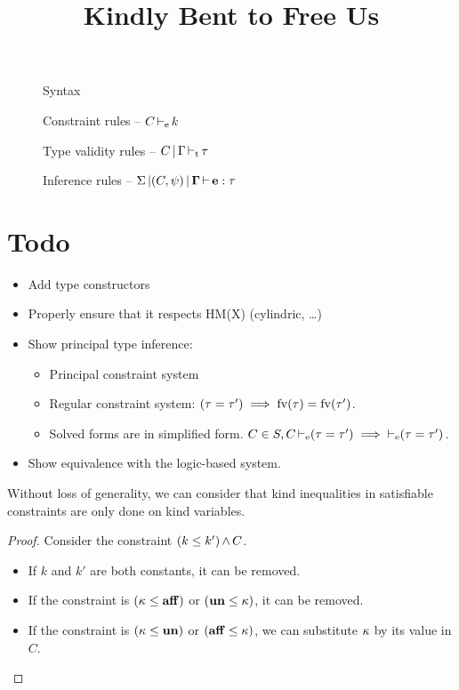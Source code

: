 \documentclass[manuscript,author]{acmart}\settopmatter{printfolios=true}
\begin{document}
\title{Kindly Bent to Free Us}
\maketitle

\begin{figure*}[h]
  \centering
  
  \caption{Syntax}
\end{figure*}
\begin{figure*}[h]
  
  \caption{Constraint rules -- $C \operatorname{\vdash_e} k$ }
\end{figure*}
\begin{figure*}[h]
  
  \caption{Type validity rules -- $C \operatorname{|} \Gamma \operatorname{\vdash_t} \tau$ }
  
  \caption{Inference rules -- $\Sigma \operatorname{|} (C,\psi) \operatorname{|} \bf{\Gamma} \operatorname{\vdash} \bf{e} : \tau$ }
\end{figure*}
%   
  

\section*{Todo}

\begin{itemize}
\item Add type constructors
\item Properly ensure that it respects HM(X) (cylindric, \dots)
\item Show principal type inference:
  \begin{itemize}
  \item Principal constraint system
  \item Regular constraint system: $(\tau = \tau') \implies \operatorname{fv}(\tau) = \operatorname{fv}(\tau')$.
  \item Solved forms are in simplified form.
    $C\in S, C \operatorname{\vdash_e} (\tau = \tau') \implies \operatorname{\vdash_e} (\tau = \tau')$.
  \end{itemize}
\item Show equivalence with the logic-based system.

\end{itemize}


\begin{lemma}
  Without loss of generality, we can consider that
  kind inequalities in satisfiable constraints
  are only done on kind variables. 

  \begin{proof}
    Consider the constraint $(k \leq k')\operatorname{\wedge} C$.
    \begin{itemize}
    \item If $k$ and $k'$ are both constants, it can be removed.
    \item If the constraint is $(\kappa \leq \mathbf{aff})$ or $(\mathbf{un} \leq \kappa)$, it can be removed.
    \item If the constraint is $(\kappa \leq \mathbf{un})$ or $(\mathbf{aff} \leq \kappa)$, we
      can substitute $\kappa$ by its value in $C$.
    \end{itemize}
  \end{proof}
\end{lemma}
\end{document}
